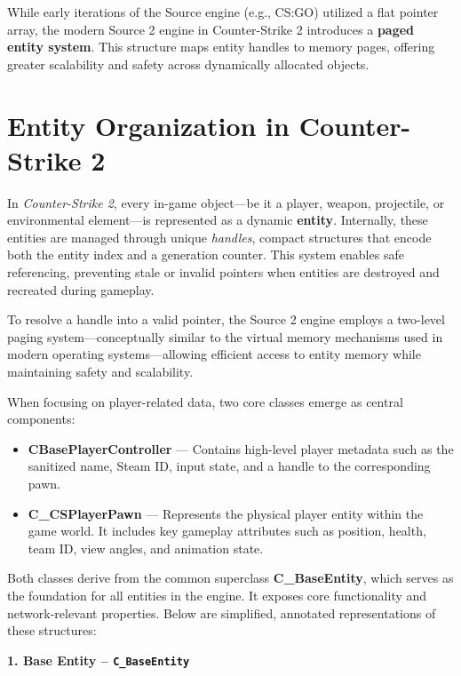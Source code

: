 While early iterations of the Source engine (e.g., CS:GO) utilized a flat pointer array, the modern Source 2 engine in Counter-Strike 2 introduces a \textbf{paged entity system}. This structure maps entity handles to memory pages, offering greater scalability and safety across dynamically allocated objects.




\section{Entity Organization in Counter-Strike 2}

In \textit{Counter-Strike 2}, every in-game object—be it a player, weapon, projectile, or environmental element—is represented as a dynamic \textbf{entity}. Internally, these entities are managed through unique \textit{handles}, compact structures that encode both the entity index and a generation counter. This system enables safe referencing, preventing stale or invalid pointers when entities are destroyed and recreated during gameplay.

To resolve a handle into a valid pointer, the Source 2 engine employs a two-level paging system—conceptually similar to the virtual memory mechanisms used in modern operating systems—allowing efficient access to entity memory while maintaining safety and scalability.

When focusing on player-related data, two core classes emerge as central components:

\begin{itemize}
    \item \textbf{CBasePlayerController} — Contains high-level player metadata such as the sanitized name, Steam ID, input state, and a handle to the corresponding pawn.
    \item \textbf{C\_CSPlayerPawn} — Represents the physical player entity within the game world. It includes key gameplay attributes such as position, health, team ID, view angles, and animation state.
\end{itemize}

Both classes derive from the common superclass \textbf{C\_BaseEntity}, which serves as the foundation for all entities in the engine. It exposes core functionality and network-relevant properties. Below are simplified, annotated representations of these structures:


\vspace{1em}
\noindent\textbf{1. Base Entity – \texttt{C\_BaseEntity}}

